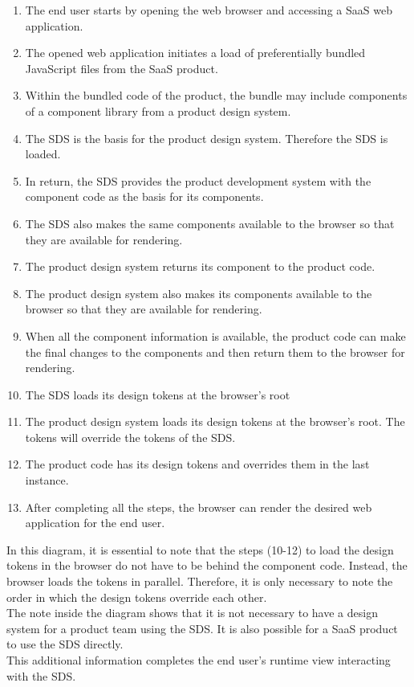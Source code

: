 \begin{enumerate}
    \item The end user starts by opening the web browser and accessing a \ac{SaaS} web application. 
    \item The opened web application initiates a load of preferentially bundled JavaScript files from the \ac{SaaS} product.
    \item  Within the bundled code of the product, the bundle may include components of a component library from a product design system.
    \item The \acl{SDS} is the basis for the product design system. Therefore the \ac{SDS} is loaded. 
    \item In return, the \ac{SDS} provides the product development system with the component code as the basis for its components.
    \item The \ac{SDS} also makes the same components available to the browser so that they are available for rendering.
    \item The product design system returns its component to the product code.
    \item The product design system also makes its components available to the browser so that they are available for rendering.
    \item When all the component information is available, the product code can make the final changes to the components and then return them to the browser for rendering.
    \item The \ac{SDS} loads its design tokens at the browser's root
    \item The product design system loads its design tokens at the browser's root. The tokens will override the tokens of the \ac{SDS}.
    \item The product code has its design tokens and overrides them in the last instance.
    \item After completing all the steps, the browser can render the desired web application for the end user. 
\end{enumerate}
In this diagram, it is essential to note that the steps (10-12) to load the design tokens in the browser do not have to be behind the component code. Instead, the browser loads the tokens in parallel. Therefore, it is only necessary to note the order in which the design tokens override each other. \\
The note inside the diagram shows that it is not necessary to have a design system for a product team using the \ac{SDS}. It is also possible for a \ac{SaaS} product to use the \ac{SDS} directly.\\
This additional information completes the end user's runtime view interacting with the \ac{SDS}. 

